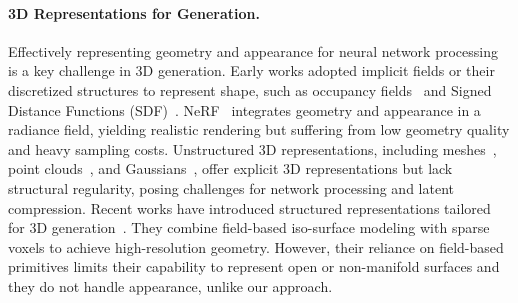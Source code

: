 \documentclass[10pt,twocolumn,letterpaper]{article}
\newcommand{\paravspace}{\vspace{-11pt}}
\begin{document}
\paragraph{3D Representations for Generation.}
Effectively representing geometry and appearance for neural network processing is a key challenge in 3D generation.
Early works adopted implicit fields or their discretized structures to represent shape, such as occupancy fields~\cite{mescheder2019occupancy} and Signed Distance Functions (SDF)~\cite{park2019deepsdf,deng2021deformed,hui2022neural,zheng2023lasdiffusion}.
NeRF~\cite{mildenhall2021nerf,tang2023volumediffusion,muller2023diffrf}  integrates geometry and appearance in a radiance field, yielding realistic rendering but suffering from low geometry quality and heavy sampling costs.
Unstructured 3D representations, including meshes~\cite{nash2020polygen,chen2024meshanything}, point clouds~\cite{nichol2022point,luo2021diffusion,zhou20213d}, and  Gaussians~\cite{kerbl20233d,yu2024mip,zhang2024gaussiancube,he2024gvgen}, offer explicit 3D representations but lack structural regularity, posing challenges for network processing and latent compression.
Recent works have introduced structured representations tailored for 3D generation~\cite{he2025sparseflex,li2025sparc3d}. They combine field-based iso-surface modeling with sparse voxels to achieve high-resolution geometry. However, their reliance on field-based primitives limits their capability to represent open or non-manifold surfaces and they do not handle appearance, unlike our approach.

\paravspace
\end{document}
